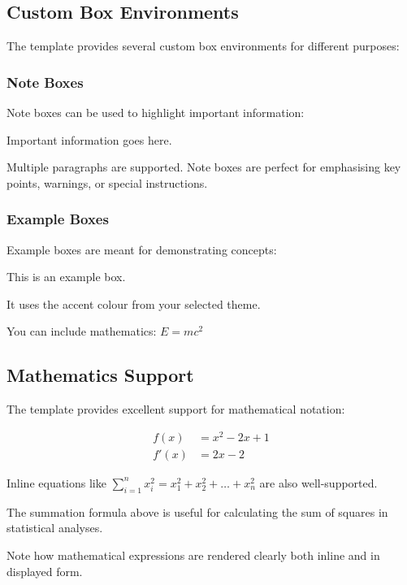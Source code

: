 \documentclass[a4paper,11pt]{article}
\begin{document}
\subsection{Custom Box Environments}
The template provides several custom box environments for different purposes:

\subsubsection{Note Boxes}
Note boxes can be used to highlight important information:

\begin{notetbox}
    Important information goes here. 
    
    Multiple paragraphs are supported. Note boxes are perfect for emphasising key points, warnings, or special instructions.
\end{notetbox}

\subsubsection{Example Boxes}
Example boxes are meant for demonstrating concepts:

\begin{exampletbox}
    This is an example box.
    
    It uses the accent colour from your selected theme.
    
    You can include mathematics: $E = mc^2$
\end{exampletbox}

\subsection{Mathematics Support}
The template provides excellent support for mathematical notation:

\begin{align}
    f(x) &= x^2 - 2x + 1 \\
    f'(x) &= 2x - 2
\end{align}

Inline equations like $\sum_{i=1}^n x_i^2 = x_1^2 + x_2^2 + \dots + x_n^2$ are also well-supported.

\begin{notetbox}
    The summation formula above is useful for calculating the sum of squares in statistical analyses.

    Note how mathematical expressions are rendered clearly both inline and in displayed form.
\end{notetbox}
\end{document}
